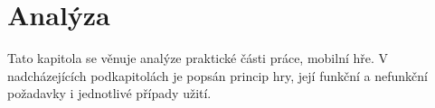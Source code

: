 \chapter{Analýza}
\label{chap:analysis}

Tato kapitola se věnuje analýze praktické části práce,
mobilní hře.
V nadcházejících podkapitolách je popsán princip hry,
její funkční a nefunkční požadavky
i jednotlivé případy užití.





